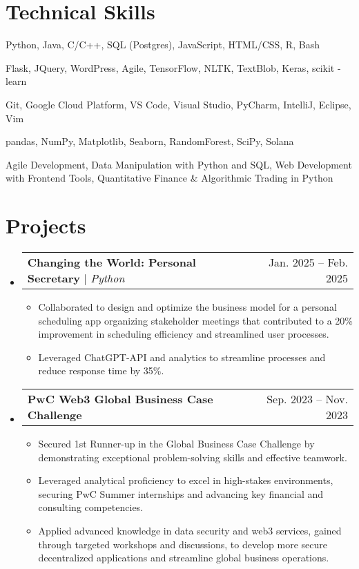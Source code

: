 \documentclass[letterpaper,11pt]{article}
\makeatletter
\newcommand{\resumeItem}[1]{
  \item\small{#1 \vspace{-2pt}}
}
\newcommand{\resumeProjectHeading}[2]{
  \item
    \begin{tabular*}{0.97\textwidth}{l@{\extracolsep{\fill}}r}
      \small #1 & #2 \\
    \end{tabular*}\vspace{-7pt}
}
\newcommand{\resumeSubHeadingListStart}{\begin{itemize}[leftmargin=0.15in, label={}]}
\newcommand{\resumeSubHeadingListEnd}{\end{itemize}}
\newcommand{\resumeItemListStart}{\begin{itemize}}
\newcommand{\resumeItemListEnd}{\end{itemize}\vspace{-5pt}}
\makeatother
\begin{document}
\section{Technical Skills}
\resumeSubHeadingListStart
  \begin{description}[leftmargin=0cm, style=unboxed, itemsep=0pt, topsep=0pt, parsep=0pt, partopsep=0pt]
    \item[\textbf{Languages:}] Python, Java, C/C++, SQL (Postgres), JavaScript, HTML/CSS, R, Bash
    \item[\textbf{Frameworks:}] Flask, JQuery, WordPress, Agile, TensorFlow, NLTK, TextBlob, Keras, scikit - learn
    \item[\textbf{Developer Tools:}] Git, Google Cloud Platform, VS Code, Visual Studio, PyCharm, IntelliJ, Eclipse, Vim
    \item[\textbf{Libraries:}] pandas, NumPy, Matplotlib, Seaborn, RandomForest, SciPy, Solana
    \item[\textbf{Certifications:}] Agile Development, Data Manipulation with Python and SQL, Web Development with Frontend Tools, Quantitative Finance \& Algorithmic Trading in Python
  \end{description}
\resumeSubHeadingListEnd

\section{Projects}
\resumeSubHeadingListStart
    \resumeProjectHeading
          {\textbf{Changing the World: Personal Secretary} $|$ \emph{Python}}{Jan. 2025 -- Feb. 2025 }
    \resumeItemListStart
        \resumeItem{Collaborated to design and optimize the business model for a personal scheduling app organizing stakeholder meetings that contributed to a 20\% improvement in scheduling efficiency and streamlined user processes.}
        \resumeItem{Leveraged ChatGPT-API and analytics to streamline processes and reduce response time by 35\%.}
    \resumeItemListEnd
    \resumeProjectHeading
          {\textbf{PwC Web3 Global Business Case Challenge}}{Sep. 2023 -- Nov. 2023}
    \resumeItemListStart
        \resumeItem{Secured 1st Runner-up in the Global Business Case Challenge by demonstrating exceptional problem-solving skills and effective teamwork.} 
        \resumeItem{Leveraged analytical proficiency to excel in high-stakes environments, securing PwC Summer internships and advancing key financial and consulting competencies.}
        \resumeItem{Applied advanced knowledge in data security and web3 services, gained through targeted workshops and discussions, to develop more secure decentralized applications and streamline global business operations.}
    \resumeItemListEnd          
\resumeSubHeadingListEnd
\end{document}
